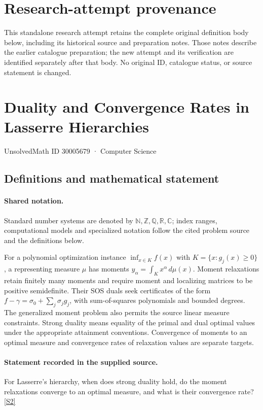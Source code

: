 \documentclass[11pt]{article}
\begin{document}
\section*{Research-attempt provenance}
This standalone research attempt retains the complete original definition body below,
including its historical source and preparation notes. Those notes describe the
earlier catalogue preparation; the new attempt and its verification are identified
separately after that body. No original ID, catalogue status, or source statement is changed.

\section{Duality and Convergence Rates in Lasserre Hierarchies}\label{30005679}
{\small UnsolvedMath ID 30005679 · Computer Science}
\subsection{Definitions and mathematical statement}

\paragraph{Shared notation.}Standard number systems are denoted by $\mathbb N,\mathbb Z,\mathbb Q,\mathbb R,\mathbb C$; index ranges, computational models and specialized notation follow the cited problem source and the definitions below.


For a polynomial optimization instance $\inf_{x\in K}f(x)$ with $K=\{x:g_j(x)\geq0\}$, a representing measure $\mu$ has moments $y_\alpha=\int_K x^\alpha\,d\mu(x)$. Moment relaxations retain finitely many moments and require moment and localizing matrices to be positive semidefinite. Their SOS duals seek certificates of the form $f-\gamma=\sigma_0+\sum_j\sigma_jg_j$, with sum-of-squares polynomials and bounded degrees. The generalized moment problem also permits the source linear measure constraints. Strong duality means equality of the primal and dual optimal values under the appropriate attainment conventions. Convergence of moments to an optimal measure and convergence rates of relaxation values are separate targets.
\paragraph{Statement recorded in the supplied source.}
For Lasserre's hierarchy, when does strong duality hold, do the moment relaxations converge to an optimal measure, and what is their convergence rate? \href{https://doi.org/10.4171/owr/2023/35}{[S2]}
\end{document}
